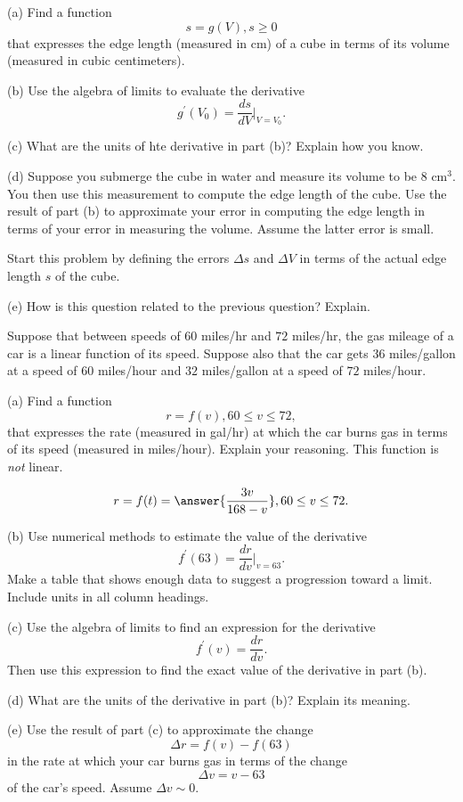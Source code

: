 \documentclass{ximera}
\begin{document}
\begin{question}  \label{Qd9fsd0g}
(a) Find a function 
\[
   s = g(V) , s\geq 0
\]
that expresses the edge length (measured in cm) of a cube in terms of its volume (measured in cubic centimeters).

(b) Use the algebra of limits to evaluate the derivative
\[
       g^\prime(V_0) = \frac{ds}{dV}\Big|_{V=V_0}.
\]

(c) What are the units of hte derivative in part (b)? Explain how you know.

(d) Suppose you submerge the cube in water and measure its volume to be $8\text{ cm}^3$. You then use this measurement to compute the edge length of the cube. Use the result of part (b) to approximate your error in computing the edge length in terms of your error in measuring the volume. Assume the latter error is small. 

Start this problem by defining the errors $\Delta s$ and $\Delta V$ in terms of the actual edge length $s$ of the cube.

(e) How is this question related to the previous question? Explain.

\end{question}




\begin{question}  \label{Q354rertb}
Suppose that between speeds of $60$ miles/hr and $72$ miles/hr, the gas mileage of a car is a linear function of its speed. Suppose also that the car gets $36$ miles/gallon at a speed of $60$ miles/hour and $32$ miles/gallon at a speed of $72$ miles/hour.

(a) Find a function
\[
    r = f(v) , 60\leq v \leq 72 ,
\]
that expresses the rate (measured in gal/hr) at which the car burns gas in terms of its speed (measured in miles/hour). Explain your reasoning. This function is \emph{not} linear.
\begin{hint}
\[
        r = f(t) = \answer{\frac{3v}{168-v}} , 60\leq v \leq 72 .
\]
\end{hint}

(b) Use numerical methods to estimate the value of the derivative
\[
    f^\prime(63) = \frac{dr}{dv}\Big|_{v=63} .
\]
Make a table that shows enough data to suggest a progression toward a limit. Include units in all column headings.

(c) Use the algebra of limits to find an expression for the derivative
\[
   f^\prime(v) = \frac{dr}{dv} .
\]
Then use this expression to find the exact value of the derivative in part (b). 

(d) What are the units of the derivative in part (b)? Explain its meaning.

(e) Use the result of part (c) to approximate the change 
\[
       \Delta r = f(v) - f(63)
\]
in the rate at which your car burns gas in terms of the change
\[
     \Delta v = v - 63
\]
of the car's speed. Assume $\Delta v \sim 0$.

\end{question}
\end{document}
